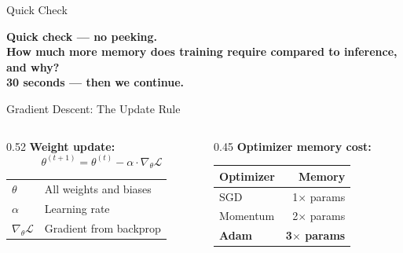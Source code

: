 \documentclass[aspectratio=169, 12pt]{beamer}
\begin{document}
\begin{frame}{Quick Check}

\centering
\Large\bfseries Quick check --- no peeking.\\[0.5cm]
\normalsize How much more memory does training require compared to inference, and why?\\[0.3cm]
{\small 30 seconds --- then we continue.}
\end{frame}



\begin{frame}{Gradient Descent: The Update Rule}

\small
\begin{columns}[T]
  \begin{column}{0.52\textwidth}
    \textbf{Weight update:}
    $$\theta^{(t+1)} = \theta^{(t)} - \alpha \cdot \nabla_\theta \mathcal{L}$$

    \vspace{0.1cm}
    {\footnotesize
    \begin{tabular}{@{}ll@{}}
      $\theta$ & All weights and biases \\
      $\alpha$ & Learning rate \\
      $\nabla_\theta \mathcal{L}$ & Gradient from backprop \\
    \end{tabular}
    }

    \vspace{0.15cm}
  \end{column}
  \begin{column}{0.45\textwidth}
    \vspace{0.1cm}
    \textbf{Optimizer memory cost:}

    \vspace{0.1cm}
    {\footnotesize
    \renewcommand{\arraystretch}{1.15}
    \begin{tabular}{@{}lr@{}}
      \toprule
      \textbf{Optimizer} & \textbf{Memory} \\
      \midrule
      SGD   & 1$\times$ params \\
      Momentum & 2$\times$ params \\
      \textbf{Adam} & \textbf{3$\times$ params} \\
      \bottomrule
    \end{tabular}
    }


\end{column}
\end{columns}
\end{frame}
\end{document}
